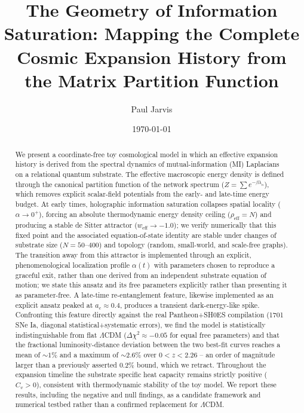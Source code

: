 \documentclass[onecolumn,PRD,amsmath,amssymb,aps,nofootinbib,superscriptaddress,11pt]{revtex4-2}
\begin{document}
\title{The Geometry of Information Saturation: Mapping the Complete Cosmic Expansion History from the Matrix Partition Function}

\author{Paul Jarvis}

\date{\today}

\begin{abstract}
We present a coordinate-free toy cosmological model in which an effective expansion history is derived from the spectral dynamics of mutual-information (MI) Laplacians on a relational quantum substrate. The effective macroscopic energy density is defined through the canonical partition function of the network spectrum ($Z = \sum e^{-\beta \lambda_n}$), which removes explicit scalar-field potentials from the early- and late-time energy budget. At early times, holographic information saturation collapses spatial locality ($\alpha \to 0^+$), forcing an absolute thermodynamic energy density ceiling ($\rho_{\text{eff}} = N$) and producing a stable de Sitter attractor ($w_{\text{eff}} \to -1.0$); we verify numerically that this fixed point and the associated equation-of-state identity are stable under changes of substrate size ($N=50$--$400$) and topology (random, small-world, and scale-free graphs). The transition away from this attractor is implemented through an explicit, phenomenological localization profile $\alpha(t)$ with parameters chosen to reproduce a graceful exit, rather than one derived from an independent substrate equation of motion; we state this ansatz and its free parameters explicitly rather than presenting it as parameter-free. A late-time re-entanglement feature, likewise implemented as an explicit ansatz peaked at $a_c \approx 0.4$, produces a transient dark-energy-like spike. Confronting this feature directly against the real Pantheon+SH0ES compilation (1701 SNe Ia, diagonal statistical+systematic errors), we find the model is statistically indistinguishable from flat $\Lambda$CDM ($\Delta\chi^2 \approx -0.05$ for equal free parameters) and that the fractional luminosity-distance deviation between the two best-fit curves reaches a mean of $\sim 1\%$ and a maximum of $\sim 2.6\%$ over $0<z<2.26$ -- an order of magnitude larger than a previously asserted $0.2\%$ bound, which we retract. Throughout the expansion timeline the substrate specific heat capacity remains strictly positive ($C_v > 0$), consistent with thermodynamic stability of the toy model. We report these results, including the negative and null findings, as a candidate framework and numerical testbed rather than a confirmed replacement for $\Lambda$CDM.
\end{abstract}
\end{document}
